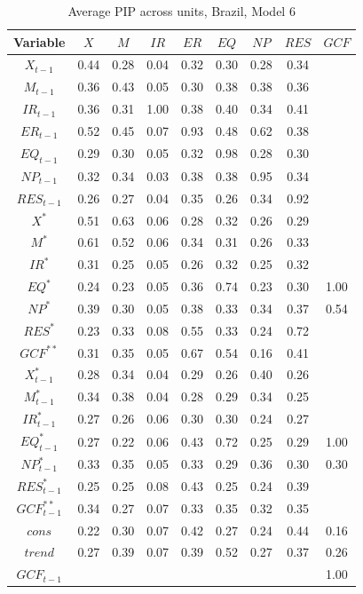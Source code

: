 \documentclass[a4paper, twoside]{templates/ociamthesis}
\begin{document}
\begin{table}[!ht]

\caption{\label{tab:Table55BR6}Average PIP across units, Brazil, Model 6}
\centering
\fontsize{8}{10}\selectfont
\begin{tabular}[t]{ccccccccc}
\toprule
Variable & $X$ & $M$ & $IR$ & $ER$ & $EQ$ & $NP$ & $RES$ & $GCF$\\
\midrule
$X_{t-1}$ & 0.44 & 0.28 & 0.04 & 0.32 & 0.30 & 0.28 & 0.34 & \\
$M_{t-1}$ & 0.36 & 0.43 & 0.05 & 0.30 & 0.38 & 0.38 & 0.36 & \\
$IR_{t-1}$ & 0.36 & 0.31 & 1.00 & 0.38 & 0.40 & 0.34 & 0.41 & \\
$ER_{t-1}$ & 0.52 & 0.45 & 0.07 & 0.93 & 0.48 & 0.62 & 0.38 & \\
$EQ_{t-1}$ & 0.29 & 0.30 & 0.05 & 0.32 & 0.98 & 0.28 & 0.30 & \\
$NP_{t-1}$ & 0.32 & 0.34 & 0.03 & 0.38 & 0.38 & 0.95 & 0.34 & \\
$RES_{t-1}$ & 0.26 & 0.27 & 0.04 & 0.35 & 0.26 & 0.34 & 0.92 & \\
$X^*$ & 0.51 & 0.63 & 0.06 & 0.28 & 0.32 & 0.26 & 0.29 & \\
$M^*$ & 0.61 & 0.52 & 0.06 & 0.34 & 0.31 & 0.26 & 0.33 & \\
$IR^*$ & 0.31 & 0.25 & 0.05 & 0.26 & 0.32 & 0.25 & 0.32 & \\
$EQ^*$ & 0.24 & 0.23 & 0.05 & 0.36 & 0.74 & 0.23 & 0.30 & 1.00\\
$NP^*$ & 0.39 & 0.30 & 0.05 & 0.38 & 0.33 & 0.34 & 0.37 & 0.54\\
$RES^*$ & 0.23 & 0.33 & 0.08 & 0.55 & 0.33 & 0.24 & 0.72 & \\
$GCF^{**}$ & 0.31 & 0.35 & 0.05 & 0.67 & 0.54 & 0.16 & 0.41 & \\
$X^*_{t-1}$ & 0.28 & 0.34 & 0.04 & 0.29 & 0.26 & 0.40 & 0.26 & \\
$M^*_{t-1}$ & 0.34 & 0.38 & 0.04 & 0.28 & 0.29 & 0.34 & 0.25 & \\
$IR^*_{t-1}$ & 0.27 & 0.26 & 0.06 & 0.30 & 0.30 & 0.24 & 0.27 & \\
$EQ^*_{t-1}$ & 0.27 & 0.22 & 0.06 & 0.43 & 0.72 & 0.25 & 0.29 & 1.00\\
$NP^*_{t-1}$ & 0.33 & 0.35 & 0.05 & 0.33 & 0.29 & 0.36 & 0.30 & 0.30\\
$RES^*_{t-1}$ & 0.25 & 0.25 & 0.08 & 0.43 & 0.25 & 0.24 & 0.39 & \\
$GCF^{**}_{t-1}$ & 0.34 & 0.27 & 0.07 & 0.33 & 0.35 & 0.32 & 0.35 & \\
$cons$ & 0.22 & 0.30 & 0.07 & 0.42 & 0.27 & 0.24 & 0.44 & 0.16\\
$trend$ & 0.27 & 0.39 & 0.07 & 0.39 & 0.52 & 0.27 & 0.37 & 0.26\\
$GCF_{t-1}$ &  &  &  &  &  &  &  & 1.00\\
\bottomrule
\end{tabular}
\end{table}
\end{document}
